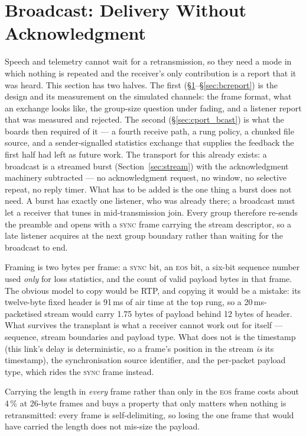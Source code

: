 \section{Broadcast: Delivery Without Acknowledgment}
\label{sec:broadcast}

Speech and telemetry cannot wait for a retransmission, so they need a
mode in which nothing is repeated and the receiver's only contribution
is a report that it was heard.  This section has two halves.  The
first (\S\ref{sec:broadcast}--\S\ref{sec:bcreport}) is the design and
its measurement on the simulated channels: the frame format, what an
exchange looks like, the group-size question under fading, and a
listener report that was measured and rejected.  The second
(\S\ref{sec:cport_bcast}) is what the boards then required of it ---
a fourth receive path, a rung policy, a chunked file source, and a
sender-signalled statistics exchange that supplies the feedback the
first half had left as future work.  The transport for this already
exists:
a broadcast is a streamed burst (Section~\ref{sec:stream}) with the
acknowledgment machinery subtracted --- no acknowledgment request, no
window, no selective repeat, no reply timer.  What has to be added is
the one thing a burst does not need.  A burst has exactly one listener,
who was already there; a broadcast must let a receiver that tunes in
mid-transmission join.  Every group therefore re-sends the preamble and
opens with a \textsc{sync} frame carrying the stream descriptor, so a
late listener acquires at the next group boundary rather than waiting
for the broadcast to end.

Framing is two bytes per frame: a \textsc{sync} bit, an \textsc{eos}
bit, a six-bit sequence number used \emph{only} for loss statistics, and
the count of valid payload bytes in that frame.  The obvious model to
copy would be RTP, and copying it would be a mistake: its twelve-byte
fixed header is 91\,ms of air time at the top rung, so a
20\,ms-packetised stream would carry 1.75 bytes of payload behind
12 bytes of header.  What survives the transplant is what a receiver
cannot work out for itself --- sequence, stream boundaries and payload
type.  What does not is the timestamp (this link's delay is
deterministic, so a frame's position in the stream \emph{is} its
timestamp), the synchronisation source identifier, and the per-packet
payload type, which rides the \textsc{sync} frame instead.

Carrying the length in \emph{every} frame rather than only in the
\textsc{eos} frame costs about 4\,\% at 26-byte frames and buys a
property that only matters when nothing is retransmitted: every frame
is self-delimiting, so losing the one frame that would have carried the
length does not mis-size the payload.

